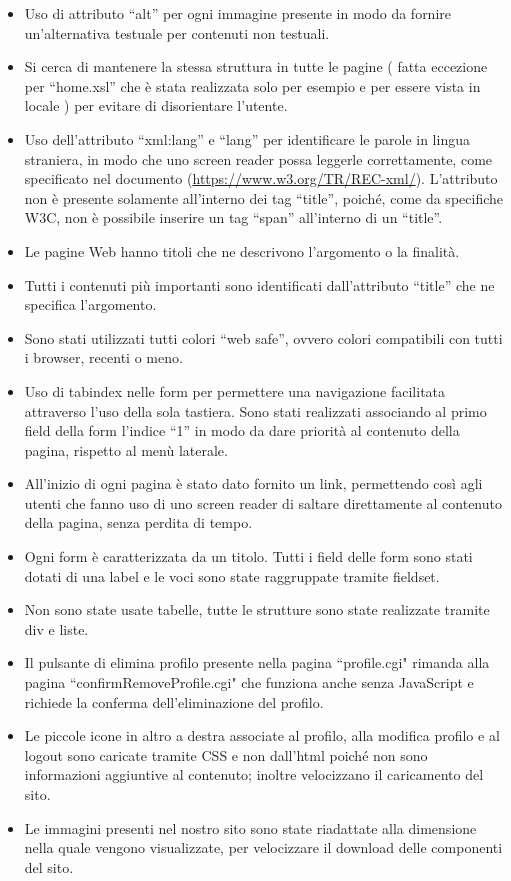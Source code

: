 \documentclass[12pt]{article}
\begin{document}
	\begin{itemize}
	\item Uso di attributo “alt” per ogni immagine presente in modo da fornire un’alternativa testuale per contenuti non testuali.
	\item Si cerca di mantenere la stessa struttura in tutte le pagine ( fatta eccezione per “home.xsl” che è stata realizzata solo per esempio e per essere vista in locale ) per evitare di disorientare l’utente. 
	\item Uso dell'attributo “xml:lang” e “lang” per identificare le parole in lingua straniera, in modo che uno screen reader possa leggerle correttamente, come specificato nel documento (\url{https://www.w3.org/TR/REC-xml/}). L’attributo non è presente solamente all’interno dei tag “title”, poiché, come da specifiche W3C, non è possibile inserire un tag “span” all’interno di un “title”.
	\item Le pagine Web hanno titoli che ne descrivono l’argomento o la finalità.
	\item Tutti i contenuti più importanti sono identificati dall’attributo “title” che ne specifica l'argomento.
	\item Sono stati utilizzati tutti colori “web safe”, ovvero colori compatibili con tutti i browser, recenti o meno.
	\item Uso di tabindex nelle form per permettere una navigazione facilitata attraverso l’uso della sola tastiera. Sono stati realizzati associando al primo field della form l’indice “1” in modo da dare priorità al contenuto della pagina, rispetto al menù laterale.
	\item All’inizio di ogni pagina è stato dato fornito un link, permettendo così agli utenti che fanno uso di uno screen reader di saltare direttamente al contenuto della pagina, senza perdita di tempo.
	\item Ogni form è caratterizzata da un titolo. Tutti i field delle form sono stati dotati di una label e le voci sono state raggruppate tramite fieldset.
	\item Non sono state usate tabelle, tutte le strutture sono state realizzate tramite div e liste.
	\item Il pulsante di elimina profilo presente nella pagina “profile.cgi" rimanda alla pagina “confirmRemoveProfile.cgi" che funziona anche senza JavaScript e richiede la conferma dell’eliminazione del profilo.
	\item Le piccole icone in altro a destra associate al profilo, alla modifica profilo e al logout sono caricate tramite CSS e non dall'html poiché non sono informazioni aggiuntive al contenuto; inoltre velocizzano il caricamento del sito.
	\item Le immagini presenti nel nostro sito sono state riadattate alla dimensione nella quale vengono visualizzate, per velocizzare il download delle componenti del sito.
	\end{itemize}
	
\end{document}
